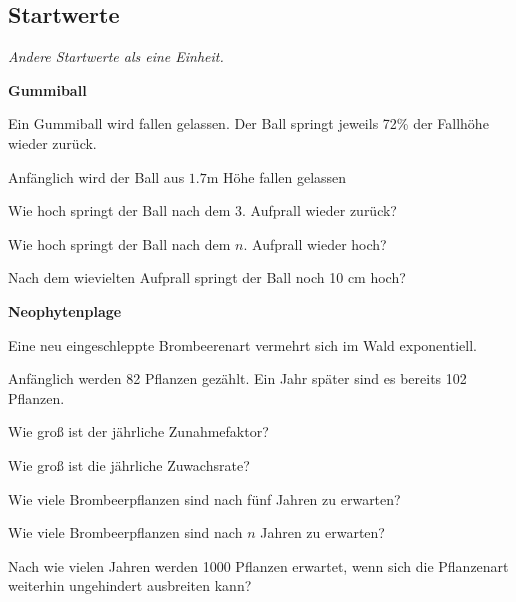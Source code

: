 \subsection{Startwerte}
\textit{Andere Startwerte als eine Einheit.}


\bbwActAufgabenNr{} \textbf{Gummiball}

Ein Gummiball wird fallen gelassen. Der Ball springt jeweils 72\% der Fallhöhe wieder zurück.

Anfänglich wird der Ball aus $1.7 \textrm{m}$ Höhe fallen gelassen

\begin{bbwAufgabenBlock}

\item Wie hoch springt der Ball nach dem 3. Aufprall wieder zurück?
\item Wie hoch springt der Ball nach dem $n$. Aufprall wieder hoch?
\item Nach dem wievielten Aufprall springt der Ball noch 10 cm hoch?
\end{bbwAufgabenBlock}
\platzFuerBerechnungenBisEndeSeite{}



\bbwActAufgabenNr{} \textbf{Neophytenplage}

Eine neu eingeschleppte Brombeerenart vermehrt sich im Wald exponentiell.

Anfänglich werden 82 Pflanzen gezählt. Ein Jahr später sind es bereits 102 Pflanzen.

\begin{bbwAufgabenBlock}

\item Wie groß ist der jährliche Zunahmefaktor?
\item Wie groß ist die jährliche Zuwachsrate?
      
\item Wie viele Brombeerpflanzen sind nach fünf Jahren zu erwarten?

\item Wie viele Brombeerpflanzen sind nach $n$ Jahren zu erwarten?
\item Nach wie vielen Jahren werden 1000 Pflanzen erwartet, wenn sich die Pflanzenart weiterhin ungehindert ausbreiten kann?
\end{bbwAufgabenBlock}
\platzFuerBerechnungenBisEndeSeite{}



